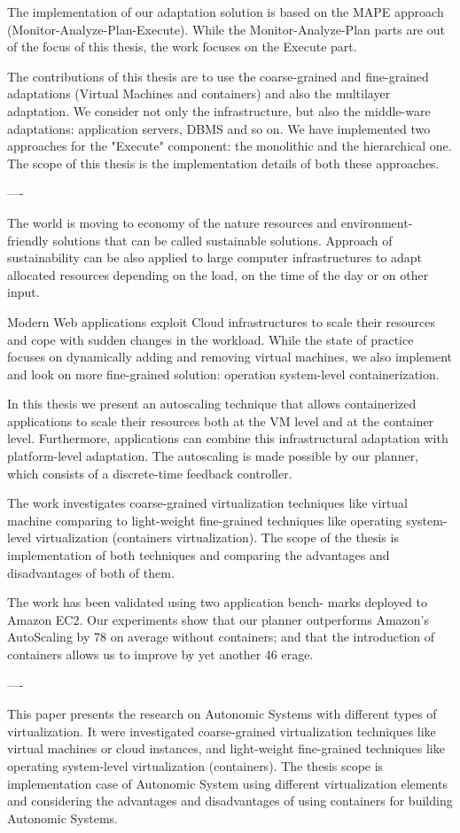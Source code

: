 The implementation of our adaptation solution is based on the MAPE approach (Monitor-Analyze-Plan-Execute). While the Monitor-Analyze-Plan parts are out of the focus of this thesis, the work focuses on the Execute part.

The contributions of this thesis are to use the coarse-grained  and fine-grained adaptations (Virtual Machines and containers) and also the multilayer adaptation. We consider not only the infrastructure, but also the middle-ware adaptations: application servers, DBMS and so on.
We have implemented two approaches for the "Execute" component: the monolithic and the hierarchical one. The scope of this thesis is the implementation details of both these approaches.

----

The world is moving to economy of the nature resources and environment-friendly solutions that can be called sustainable solutions. Approach of sustainability can be also applied to large computer infrastructures to adapt allocated resources depending on the load, on the time of the day or on other input.

Modern Web applications exploit Cloud infrastructures to
scale their resources and cope with sudden changes in the
workload. While the state of practice focuses on dynamically adding and removing virtual machines, we also implement and look on more fine-grained solution: operation system-level containerization.

In this thesis we present an autoscaling technique that allows containerized applications to scale their resources both at the VM level and at the container level. Furthermore, applications can combine this infrastructural adaptation with platform-level adaptation. The autoscaling is made possible by our planner, which consists of a discrete-time feedback
controller.

The work investigates coarse-grained virtualization techniques like virtual machine comparing to light-weight fine-grained techniques like operating system-level virtualization (containers virtualization). The scope of the thesis is implementation of both techniques and comparing the advantages and disadvantages of both of them.

The work has been validated using two application bench-
marks deployed to Amazon EC2. Our experiments show
that our planner outperforms Amazon’s AutoScaling by 78%
on average without containers; and that the introduction of
containers allows us to improve by yet another 46%
erage.

----

This paper presents the research on Autonomic Systems with different types of virtualization. It were investigated coarse-grained virtualization techniques like virtual machines or cloud instances, and light-weight fine-grained techniques like operating system-level virtualization (containers). The thesis scope is implementation case of Autonomic System using different virtualization elements and considering the advantages and disadvantages of using containers for building Autonomic Systems.
\fi